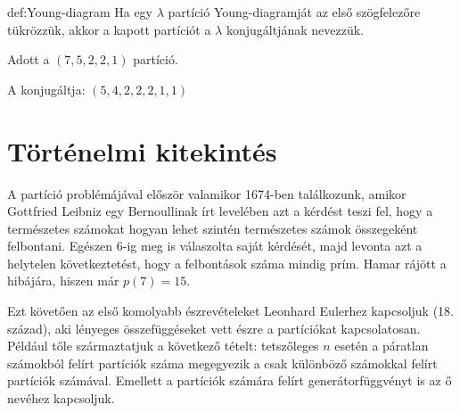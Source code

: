 \begin{definition}{def:Young-diagram}
Ha egy $\lambda$ partíció Young-diagramját az első szögfelezőre
tükrözzük, akkor a kapott partíciót a $\lambda$ konjugáltjának nevezzük. 
\end{definition}
\begin{example}
 \hspace{0.1cm}\par \begin{multicols}{2} Adott a $(7,5,2,2,1)$
partíció. \begin{center} 
\end{center}\par A konjugáltja: $(5,4,2,2,2,1,1)$\par \begin{center}
 \end{center} \end{multicols} 
\end{example}

\section*{Történelmi kitekintés}

A partíció problémájával először valamikor 1674-ben találkozunk, amikor
Gottfried Leibniz egy Bernoullinak írt levelében azt a kérdést teszi
fel, hogy a természetes számokat hogyan lehet szintén természetes
számok összegeként felbontani. Egészen 6-ig meg is válaszolta saját
kérdését, majd levonta azt a helytelen következtetést, hogy a felbontások
száma mindig prím. Hamar rájött a hibájára, hiszen már $p(7)=15$.

Ezt követően az első komolyabb észrevételeket Leonhard Eulerhez kapcsoljuk
(18. század), aki lényeges összefüggéseket vett észre a partíciókat
kapcsolatosan. Például tőle származtatjuk a következő tételt: tetszőleges
$n$ esetén a páratlan számokból felírt partíciók száma megegyezik
a csak különböző számokkal felírt partíciók számával. Emellett a partíciók
számára felírt generátorfüggvényt is az ő nevéhez kapcsoljuk.

